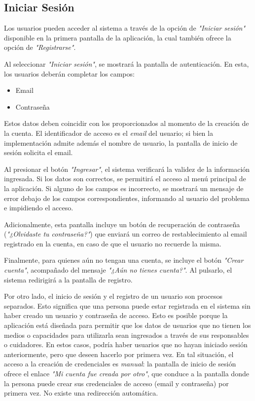 \documentclass[a4paper,12pt]{article}
\begin{document}
    \subsection{Iniciar Sesión}
    \par Los usuarios pueden acceder al sistema a través de la opción de \textit{"Iniciar sesión"} disponible en la primera pantalla de la aplicación, la cual también ofrece la opción de \textit{"Registrarse"}.
    \par Al seleccionar \textit{"Iniciar sesión"}, se mostrará la pantalla de autenticación. En esta, los usuarios deberán completar los campos:
    \begin{itemize}
        \item Email
        \item Contraseña
    \end{itemize}
    \par Estos datos deben coincidir con los proporcionados al momento de la creación de la cuenta. El identificador de acceso es el \textit{email} del usuario; si bien la implementación admite además el nombre de usuario, la pantalla de inicio de sesión solicita el email.
    \par Al presionar el botón \textit{"Ingresar"}, el sistema verificará la validez de la información ingresada. Si los datos son correctos, se permitirá el acceso al menú principal de la aplicación. Si alguno de los campos es incorrecto, se mostrará un mensaje de error debajo de los campos correspondientes, informando al usuario del problema e impidiendo el acceso.
    \par Adicionalmente, esta pantalla incluye un botón de recuperación de contraseña (\textit{"¿Olvidaste tu contraseña?"}) que enviará un correo de restablecimiento al email registrado en la cuenta, en caso de que el usuario no recuerde la misma.
    \par Finalmente, para quienes aún no tengan una cuenta, se incluye el botón \textit{"Crear cuenta"}, acompañado del mensaje \textit{"¿Aún no tienes cuenta?"}. Al pulsarlo, el sistema redirigirá a la pantalla de registro.
    \par Por otro lado, el inicio de sesión y el registro de un usuario son procesos separados. Esto significa que una persona puede estar registrada en el sistema sin haber creado un usuario y contraseña de acceso. Esto es posible porque la aplicación está diseñada para permitir que los datos de usuarios que no tienen los medios o capacidades para utilizarla sean ingresados a través de sus responsables o cuidadores. En estos casos, podría haber usuarios que no hayan iniciado sesión anteriormente, pero que deseen hacerlo por primera vez. En tal situación, el acceso a la creación de credenciales es \textit{manual}: la pantalla de inicio de sesión ofrece el enlace \textit{"Mi cuenta fue creada por otro"}, que conduce a la pantalla donde la persona puede crear sus credenciales de acceso (email y contraseña) por primera vez. No existe una redirección automática.
\end{document}
